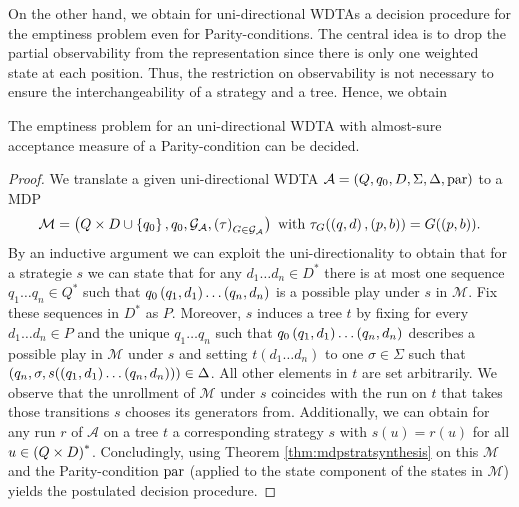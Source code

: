 On the other hand, we obtain for uni-directional \acp{WDTA} a decision 
procedure for the emptiness problem even for Parity-conditions. The central 
idea is to drop the partial observability from the representation since there
is only one weighted state at each position. Thus, the restriction on 
observability is not necessary to ensure the interchangeability of a strategy 
and a tree. Hence, we obtain
\begin{corollary}
  \cite[Corollary 47]{RandAutoInfTrees}
  The emptiness problem for an uni-directional \ac{WDTA} with almost-sure
  acceptance measure of a Parity-condition can be decided.
\end{corollary}
\begin{proof}
  We translate a given uni-directional \ac{WDTA} 
  $\mathcal{A} = \left(Q, q_{0}, D, \Sigma, \Delta, \operatorname{par}\right)$ to a \ac{MDP}
  \begin{equation*}
    \mathcal{M} = \left(Q\times D\cup\left\{q_{0}\right\}, q_{0}, 
      \mathcal{G}_{\mathcal{A}}, \left(\tau\right)_{G\in\mathcal{G}_{\mathcal{A}}}\right)
    \text{ with }\tau_{G}(\left(q, d\right), \left(p, b\right)) = G(\left(p, b\right)).
  \end{equation*}
  By an inductive argument we can exploit the uni-directionality to obtain that
  for a strategie $s$ we can state that for any $d_{1}\dots d_{n}\in D^{*}$ 
  there is at most one sequence $q_{1}\dots q_{n}\in Q^{*}$ such that
  $q_{0}\left(q_{1}, d_{1}\right)\dots\left(q_{n}, d_{n}\right)$ is a possible play under 
  $s$ in $\mathcal{M}$. Fix these sequences in $D^{*}$ as $P$. Moreover, $s$ 
  induces a tree $t$ by fixing for every $d_{1}\dots d_{n}\in P$ and the
  unique $q_{1}\dots q_{n}$ such that 
  $q_{0}\left(q_{1}, d_{1}\right)\dots\left(q_{n}, d_{n}\right)$ describes a possible 
  play in $\mathcal{M}$ under $s$ and setting
  $t(d_{1}\dots d_{n})$ to one $\sigma\in\Sigma$ such that
  $\left(q_{n},\sigma, s(\left(q_{1}, d_{1}\right)\dots\left(q_{n}, d_{n}\right))\right)
    \in\Delta$. All other elements in $t$ are set arbitrarily. We observe that 
  the unrollment of $\mathcal{M}$ under $s$ coincides with the run on $t$ that 
  takes those transitions $s$ chooses its generators from. Additionally, we can
  obtain for any run $r$ of $\mathcal{A}$ on a tree $t$ a corresponding 
  strategy $s$ with $s(u) = r(u)$ for all $u\in \left(Q\times D\right)^{*}$. 
  Concludingly, using Theorem \ref{thm:mdpstratsynthesis} on this $\mathcal{M}$
  and the Parity-condition $\operatorname{par}$ (applied to the state component of the 
  states in $\mathcal{M}$) yields the postulated decision procedure.
\end{proof}

